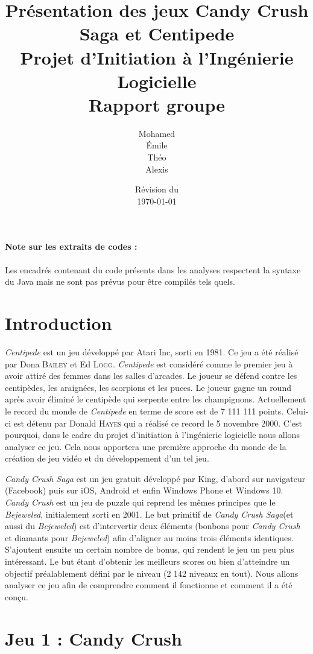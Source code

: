 \documentclass[a4paper, 12pt, oneside]{article}
\title{Présentation des jeux Candy Crush Saga et Centipede\\{\Large Projet d'Initiation à l'Ingénierie Logicielle\\Rapport groupe \no 3}}
\author{Mohamed \bsc{Lakhal}\\Émile \bsc{Jeannin}\\Théo \bsc{Mottet}\\Alexis \bsc{Cabodi}}
\date{Révision du\\\today}
\newcommand{\oeuvre}[1]{\textit{#1}}
\newcommand{\Candy}{\oeuvre{Candy Crush}\xspace} %
\newcommand{\CandyS}{\oeuvre{Candy Crush Saga}\xspace}
\newcommand{\Centi}{\oeuvre{Centipede}\xspace}
\begin{document}
\maketitle
\newpage
\tableofcontents
\bigskip
\paragraph*{Note sur les extraits de codes :} Les encadrés contenant du code présents dans les analyses respectent la syntaxe du Java mais ne sont pas prévus pour être compilés tels quels.%

\newpage

\section{Introduction}
\Centi est un jeu développé par Atari Inc, sorti en 1981. Ce jeu a été réalisé par Dona \textsc{Bailey} et Ed \textsc{Logg}. \Centi est considéré comme le premier jeu à avoir attiré des femmes dans les salles d'arcades. 
Le joueur se défend contre les centipèdes, les araignées, les scorpions et les puces. Le joueur gagne un round après avoir éliminé le centipède qui serpente entre les champignons. Actuellement le record du monde de \Centi en terme de score est de 7 111 111 points. Celui-ci est détenu par Donald \textsc{Hayes} qui a réalisé ce record le 5 novembre 2000. 
C'est pourquoi, dans le cadre du projet d'initiation à l'ingénierie logicielle nous allons analyser ce jeu. Cela nous apportera une première approche du monde de la création de jeu vidéo et du développement d'un tel jeu. 

\CandyS est un jeu gratuit développé par King, d'abord sur navigateur (Facebook) puis sur iOS, Android et enfin Windows Phone et Windows 10. \Candy est un jeu de puzzle qui reprend les mêmes principes que le \oeuvre{Bejeweled}, initialement sorti en 2001. Le but primitif de \CandyS (et aussi du \oeuvre{Bejeweled}) est d'intervertir deux éléments (bonbons pour \Candy et diamants pour \oeuvre{Bejeweled}) afin d'aligner au moins trois éléments identiques. S'ajoutent ensuite un certain nombre de bonus, qui rendent le jeu un peu plus intéressant. Le but étant d'obtenir les meilleurs scores ou bien d'atteindre un objectif préalablement défini par le niveau (2 142 niveaux en tout). Nous allons analyser ce jeu afin de comprendre comment il fonctionne et comment il a été conçu.

\section{Jeu 1 : Candy Crush}

\end{document}
